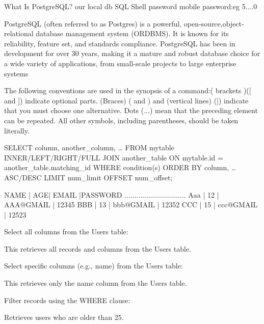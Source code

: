 What Is PostgreSQL?  our local db SQL Shell password {mobile password:eg 5....0}

PostgreSQL (often referred to as Postgres) is a powerful, open-source,object-relational database management system (ORDBMS). 
It is known for its reliability, feature set, and standards compliance. 
PostgreSQL has been in development for over 30 years, making it a mature and robust database choice for a wide variety of applications,
from small-scale projects to large enterprise systems


The following conventions are used in the synopsis of a command:( brackets )([ and ]) indicate optional parts.
(Braces) ({ and }) and (vertical lines) (|) indicate that you must choose one alternative. 
Dots (...) mean that the preceding element can be repeated. All other symbols, including parentheses, should be taken literally.




SELECT column, another_column, …
FROM mytable
INNER/LEFT/RIGHT/FULL JOIN another_table 
    ON mytable.id = another_table.matching_id
WHERE condition(s)
ORDER BY column, … ASC/DESC
LIMIT num_limit OFFSET num_offset;



NAME | AGE| EMAIL      |PASSWORD
............................... 
Aaa  | 12 |  AAA@GMAIL | 12345
BBB  | 13 |  bbb@GMAIL | 12352
CCC  | 15 |  ccc@GMAIL | 12523


{Select all} columns from the Users table:


This retrieves all records and columns from the Users table.

Select {specific columns }(e.g., name) from the Users table:


This retrieves only the name column from the Users table.

{Filter records }using the WHERE clause:


Retrieves users who are older than 25.

